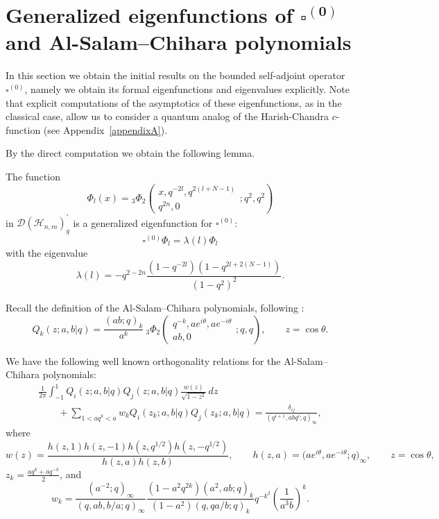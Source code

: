 \documentclass[pdftex]{sigma}
\begin{document}
\section[Generalized eigenfunctions of $\square^{(0)}$ and Al-Salam-Chihara polynomials]{Generalized eigenfunctions of $\boldsymbol{\square^{(0)}}$\\ and Al-Salam--Chihara polynomials}\label{sec_7}

In this section we obtain the initial results on the bounded self-adjoint operator $\square^{(0)}$, namely we
obtain its formal eigenfunctions and eigenvalues explicitly. Note that explicit computations of the
asymptotics of these eigenfunctions, as in the classical case, allow us to consider a quantum analog of the
Harish-Chandra $c$-function (see Appendix~\ref{appendixA}).

By the direct computation we obtain the following lemma.

\begin{lemma}\label{c1.5.2} The function
\[
\Phi_l(x) = {_{3}\Phi_{2}}\left(
\begin{array}{c}
x,q^{-2l},q^{2(l+N-1)}\\ q^{2n},0
\end{array}
;q^2,q^2\right)
\]
in $\mathscr{D}(\mathscr{H}_{n,m})_q^\prime$ is a generalized eigenfunction for $\square^{(0)}$:
\[\square^{(0)} \Phi_l=\lambda(l)\Phi_l\] with the eigenvalue
\[
\lambda(l) = - q^{2-2n}\frac{(1-q^{-2l})(1-q^{2l+2(N-1)})}{(1-q^2)^2}.
\]
\end{lemma}



Recall the def\/inition of the Al-Salam--Chihara polynomials, following \cite{koekoek}:
\[
Q_k(z;a,b|q)=\frac{(ab;q)_k}{a^k}\ {_{3}\Phi_{2}}\left(
\begin{array}{c}
q^{-k},a e^{i\theta},ae^{-i\theta}\\ ab,0
\end{array}
;q,q\right), \qquad z=\cos\theta.
\]

We have the following well known orthogonality relations for the Al-Salam--Chihara polynomials:
\begin{gather}
\frac{1}{2\pi}\int_{-1}^1 Q_i(z;a,b|q)Q_j(z;a,b|q)\frac{w(z)}{\sqrt{1-z^2}}\,dz\nonumber\\
\qquad{}+\sum_{1<aq^k<a}w_k Q_i(z_k;a,b|q)Q_j(z_k;a,b|q)=\frac{\delta_{ij}}{(q^{i+1},abq^i;q)_\infty},\label{rel_orth_ASC}
\end{gather}
where
\[
w(z)=\frac{h(z,1)h(z,-1)h(z,q^{1/2})h(z,-q^{1/2})}{h(z,a)h(z,b)}, \!\!\qquad
h(z,a)=\big(ae^{i\theta},ae^{-i\theta};q\big)_{\infty},\!\! \qquad z=\cos\theta,
\]
$z_k=\frac{aq^k+aq^{-k}}{2}$, and
\[
w_k=\frac{(a^{-2};q)_\infty}{(q,ab,b/a;q)_\infty}\frac{(1-a^2q^{2k})(a^2,ab;q)_k}
{(1-a^2)(q,qa/b;q)_k}q^{-k^2}\left(\frac{1}{a^3b}\right)^k.
\]
\end{document}
